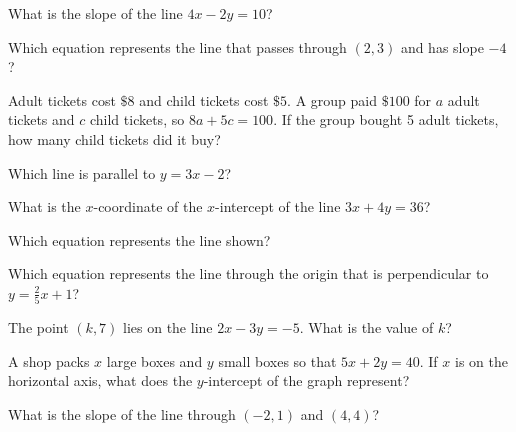 \begin{exo}{}
What is the slope of the line $4x-2y=10$?
\end{exo}
\begin{exo}{}
Which equation represents the line that passes through $(2,3)$ and has slope $-4$?
\end{exo}
\begin{exo}{}
Adult tickets cost $\$8$ and child tickets cost $\$5$. A group paid $\$100$ for $a$ adult tickets and $c$ child tickets, so $8a+5c=100$. If the group bought 5 adult tickets, how many child tickets did it buy?
\end{exo}
\begin{exo}{}
Which line is parallel to $y=3x-2$?
\end{exo}
\begin{exo}{\sprtag}
What is the $x$-coordinate of the $x$-intercept of the line $3x+4y=36$?
\end{exo}
\begin{exo}{}
Which equation represents the line shown?
\end{exo}
\begin{exo}{}
Which equation represents the line through the origin that is perpendicular to $y=\frac25x+1$?
\end{exo}
\begin{exo}{\sprtag}
The point $(k,7)$ lies on the line $2x-3y=-5$. What is the value of $k$?
\end{exo}
\begin{exo}{}
A shop packs $x$ large boxes and $y$ small boxes so that $5x+2y=40$. If $x$ is on the horizontal axis, what does the $y$-intercept of the graph represent?
\end{exo}
\begin{exo}{\sprtag}
What is the slope of the line through $(-2,1)$ and $(4,4)$?
\end{exo}

